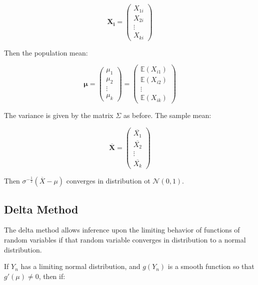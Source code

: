 \begin{equation}
\mathbf{X_i} = \left(\begin{array}{c}X_{1i}\\ X_{2i} \\ \vdots \\ X_{ki} \end{array}\right)
\end{equation}

Then the population mean:

\begin{equation}
\mathbf{\mu} = \left(\begin{array}{c} \mu_1 \\ \mu_2 \\ \vdots \\ \mu_k \end{array} \right) =  \left(\begin{array}{c} \mathbb{E}(X_{i1}) \\ \mathbb{E}(X_{i2}) \\ \vdots \\ \mathbb{E}(X_{ik}) \end{array} \right)
\end{equation}

The variance is given by the matrix $\Sigma$ as before. The sample mean:

\begin{equation}
\overline{\mathbf{X}} = \left(\begin{array}{c}\overline{X_{1}}\\ \overline{X_{2}} \\ \vdots \\ \overline{X_{k}} \end{array}\right)
\end{equation}

Then $\sigma^{-\frac{1}{2}} (\overline{X}-\mu)$ converges in distribution ot $\mathscr{N}(0,1)$.


\subsection{Delta Method}

The delta method allows inference upon the limiting behavior of functions of random variables if that random variable converges in distribution to a normal distribution.

If $Y_n$ has a limiting normal distribution, and $g(Y_n )$ is a smooth function so that $g'(\mu) \neq 0$, then if:

